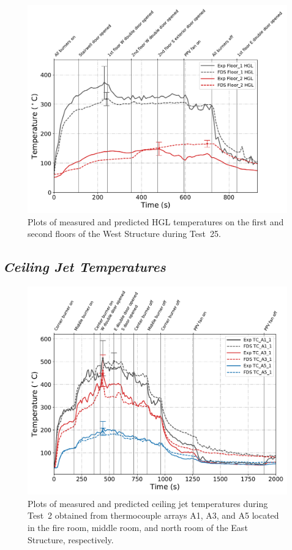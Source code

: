 \begin{figure}[!h]
	\centering
	\includegraphics[width=\columnwidth]{Figures/Plots/Validation/Temperature/Test_25_HGL}
	\caption[Plots of measured and predicted HGL temperatures during Test~25.]{Plots of measured and predicted HGL temperatures on the first and second floors of the West Structure during Test~25.}
	\label{fig:HGL_data_Test25}
\end{figure}

\clearpage
\subsection*{\textit{Ceiling Jet Temperatures}}
\vspace{4em}
\begin{figure}[!h]
	\centering
	\includegraphics[width=\columnwidth]{Figures/Plots/Validation/Temperature/Test_2_cjet_1}
	\caption[Plots of measured and predicted ceiling jet temperatures during Test~2.]{Plots of measured and predicted ceiling jet temperatures during Test~2 obtained from thermocouple arrays A1, A3, and A5 located in the fire room, middle room, and north room of the East Structure, respectively.}
	\label{fig:cjet1_data_Test2}
\end{figure}

